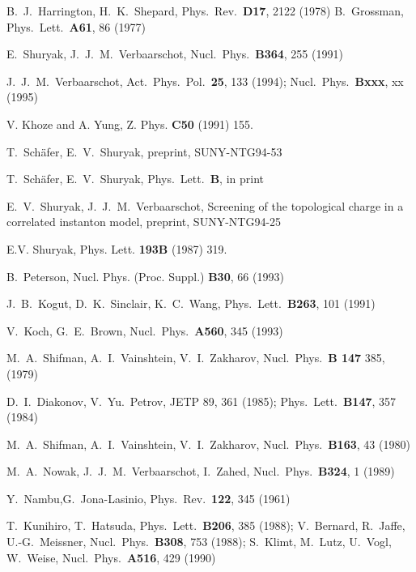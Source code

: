 \begin{thebibliography}{xx}
B.~J.~Harrington, H.~K.~Shepard,
Phys.~Rev.~{\bf D17}, 2122 (1978)
B.~Grossman,
Phys.~Lett.~{\bf A61}, 86 (1977)

E.~Shuryak, J.~J.~M.~Verbaarschot,
Nucl.~Phys.~{\bf B364}, 255 (1991)

J.~J.~M.~Verbaarschot,
Act.~Phys.~Pol.~{\bf 25}, 133 (1994);
Nucl.~Phys.~{\bf Bxxx}, xx (1995)

V. Khoze and A. Yung, Z. Phys. {\bf C50} (1991) 155.

T.~Sch\"afer, E.~V.~Shuryak,
preprint, SUNY-NTG94-53

T.~Sch\"afer, E.~V.~Shuryak,
Phys.~Lett.~{\bf B}, in print

E.~V.~Shuryak, J.~J.~M.~Verbaarschot,
Screening of the topological charge in a correlated
instanton model, preprint, SUNY-NTG94-25

E.V. Shuryak, Phys. Lett. {\bf 193B} (1987) 319.

B.~Peterson, Nucl. Phys. (Proc. Suppl.) {\bf B30}, 66 (1993)

J.~B.~Kogut, D.~K.~Sinclair, K.~C.~Wang, Phys.~Lett.~{\bf B263},
101 (1991)

V.~Koch, G.~E.~Brown,
Nucl.~Phys.~{\bf A560}, 345 (1993)

M.~A.~Shifman, A.~I.~Vainshtein, V.~I.~Zakharov,
Nucl.~Phys.~{\bf B 147} 385, (1979)

D.~I.~Diakonov, V.~Yu.~Petrov,
JETP 89, 361 (1985);
Phys.~Lett.~{\bf B147}, 357 (1984)

M.~A.~Shifman, A.~I.~Vainshtein, V.~I.~Zakharov,
Nucl.~Phys.~{\bf B163}, 43 (1980)

M.~A.~Nowak, J.~J.~M.~Verbaarschot, I.~Zahed,
Nucl.~Phys.~{\bf B324}, 1 (1989)

Y.~Nambu,G.~Jona-Lasinio, Phys.~Rev.~{\bf 122}, 345 (1961)

T.~Kunihiro, T.~Hatsuda, Phys.~Lett.~{\bf B206}, 385 (1988);
V.~Bernard, R.~Jaffe, U.-G.~Meissner, Nucl.~Phys.~{\bf B308}, 753 (1988);
S.~Klimt, M.~Lutz, U.~Vogl, W.~Weise, Nucl.~Phys.~{\bf A516}, 429 (1990)


\end{thebibliography}
